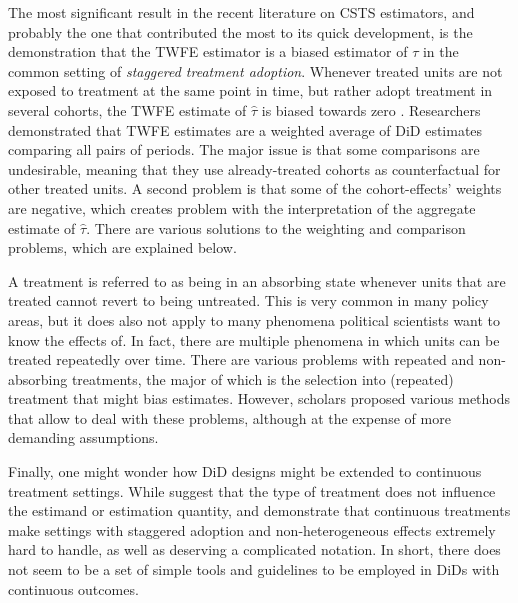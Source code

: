 \documentclass[hidelinks]{article}\usepackage[]{graphicx}\usepackage[]{color}
\begin{document}
The most significant result in the recent literature on CSTS estimators, and probably the one that contributed the most to its quick development, is the demonstration that the TWFE estimator is a biased estimator of $\tau$ in the common setting of \textit{staggered treatment adoption}. Whenever treated units are not exposed to treatment at the same point in time, but rather adopt treatment in several cohorts, the TWFE estimate of $\hat{\tau}$ is biased towards zero \parencite{GoodmanBacon2021, Callaway2021}. Researchers demonstrated that TWFE estimates are a weighted average of DiD estimates comparing all pairs of periods. The major issue is that some comparisons are undesirable, meaning that they use already-treated cohorts as counterfactual for other treated units. A second problem is that some of the cohort-effects' weights are negative, which creates problem with the interpretation of the aggregate estimate of $\hat{\tau}$. There are various solutions to the weighting and comparison problems, which are explained below.




A treatment is referred to as being in an absorbing state whenever units that are treated cannot revert to being untreated. This is very common in many policy areas, but it does also not apply to many phenomena political scientists want to know the effects of. In fact, there are multiple phenomena in which units can be treated repeatedly over time. There are various problems with repeated and non-absorbing treatments, the major of which is the selection into (repeated) treatment that might bias estimates. However, scholars proposed various methods that allow to deal with these problems, although at the expense of more demanding assumptions.

Finally, one might wonder how DiD designs might be extended to continuous treatment settings. While \textcite{Angrist2009} suggest that the type of treatment does not influence the estimand or estimation quantity, \textcite{deChaisemartin2020} and \textcite{Callaway2021} demonstrate that continuous treatments make settings with staggered adoption and non-heterogeneous effects extremely hard to handle, as well as deserving a complicated notation. In short, there does not seem to be a set of simple tools and guidelines to be employed in DiDs with continuous outcomes.
\end{document}
